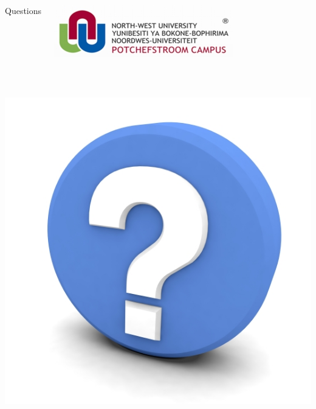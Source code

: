 \documentclass[11pt]{beamer}
\begin{document}
	\begin{frame}[t]
		\begin{columns}[onlytextwidth]
				\begin{Large}
					\vspace{-0.2cm}
					\color{beamer@maroon}Questions
				\end{Large}
				\includegraphics[scale=0.4]{nwulogo.jpeg}
		\end{columns}
		\hspace{0.1cm}
		\newline
		\noindent\makebox[\linewidth]{\rule{\paperwidth}{0.4pt}}\\
		[1cm]
		\begin{center}
				\includegraphics[scale=0.45]{q.jpg}
		\end{center}
	\end{frame}
\end{document}
